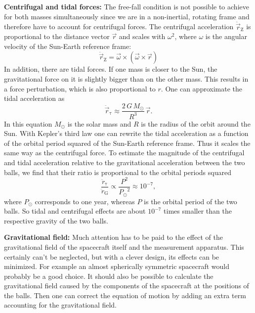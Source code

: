 \documentclass[onecolumn]{aa} %
\begin{document}
\textbf{Centrifugal and tidal forces:}
\label{sec:tidal}
The free-fall condition is not possible to achieve for both masses simultaneously since we are in a non-inertial, rotating frame and therefore have to account for centrifugal forces. The centrifugal acceleration $\ddot{\vec{r}}_{\mathrm{Z}}$ is proportional to the distance vector $\vec{r}$ and scales with $\omega^2$, where $\omega$ is the angular velocity of the Sun-Earth reference frame:
\begin{equation}
\label{eq:centrifugalacc}
\ddot{\vec{r}}_{\mathrm{Z}} = \vec{\omega} \times \left( \vec{\omega} \times \vec{r} \right) 
\end{equation}
In addition, there are tidal forces. If one mass is closer to the Sun, the gravitational force on it is slightly bigger than on the other mass. This results in a force perturbation, which is also proportional to $r$. One can approximate the tidal acceleration as
\begin{equation}
\label{eq:tidalacc}
\ddot{\vec{r}}_{\mathrm{\tau}} \approx \frac{2 \, G \, M_\odot}{R^3} \, \vec{r}.
\end{equation}
In this equation $M_\odot$ is the solar mass and $R$ is the radius of the orbit around the Sun. With Kepler's third law one can rewrite the tidal acceleration as a function of the orbital period squared of the Sun-Earth reference frame. Thus it scales the same way as the centrifugal force. To estimate the magnitude of the centrifugal and tidal acceleration relative to the gravitational acceleration between the two balls, we find that their ratio is proportional to the orbital periods squared
\begin{equation}\label{a_ratio}
\frac{\ddot{r}_{\mathrm{\tau}}}{\ddot{r}_\mathrm{G}} \propto \frac{P^2}{{P_\odot}^2} \approx 10^{-7},
\end{equation}
where $P_\odot$ corresponds to one year, whereas $P$ is the orbital period of the two balls. So tidal and centrifugal effects are about $10^{-7}$ times smaller than the respective gravity of the two balls.

\textbf{Gravitational field:}
Much attention has to be paid to the effect of the gravitational field of the spacecraft itself and the measurement apparatus. This certainly can't be neglected, but with a clever design, its effects can be minimized. For example an almost spherically symmetric spacecraft would probably be a good choice. It should also be possible to calculate the gravitational field caused by the components of the spacecraft at the positions of the balls. Then one can correct the equation of motion by adding an extra term accounting for the gravitational field.
\end{document}

